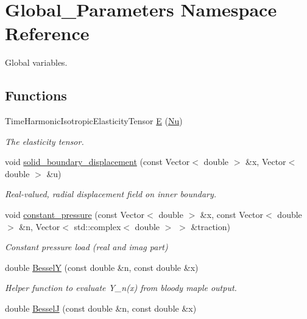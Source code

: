 \hypertarget{namespaceGlobal__Parameters}{}\section{Global\+\_\+\+Parameters Namespace Reference}
\label{namespaceGlobal__Parameters}


Global variables.  


\subsection*{Functions}
\begin{DoxyCompactItemize}
\item 
Time\+Harmonic\+Isotropic\+Elasticity\+Tensor \hyperlink{namespaceGlobal__Parameters_aeeb26e11ef275bdfce14710e00290bb6}{E} (\hyperlink{namespaceGlobal__Parameters_a20fccdcfa2c15ad8b951b9ada3bb1661}{Nu})
\begin{DoxyCompactList}\small\item\em The elasticity tensor. \end{DoxyCompactList}\item 
void \hyperlink{namespaceGlobal__Parameters_a95af753fa152ac6013bc4f640816f7ce}{solid\+\_\+boundary\+\_\+displacement} (const Vector$<$ double $>$ \&x, Vector$<$ double $>$ \&u)
\begin{DoxyCompactList}\small\item\em Real-\/valued, radial displacement field on inner boundary. \end{DoxyCompactList}\item 
void \hyperlink{namespaceGlobal__Parameters_a8363ab9f8687e9f7802f801f6dcab6e6}{constant\+\_\+pressure} (const Vector$<$ double $>$ \&x, const Vector$<$ double $>$ \&n, Vector$<$ std\+::complex$<$ double $>$ $>$ \&traction)
\begin{DoxyCompactList}\small\item\em Constant pressure load (real and imag part) \end{DoxyCompactList}\item 
double \hyperlink{namespaceGlobal__Parameters_a51c78ffbd213fe1293eef5d048abcc5a}{BesselY} (const double \&n, const double \&x)
\begin{DoxyCompactList}\small\item\em Helper function to evaluate Y\+\_\+n(x) from bloody maple output. \end{DoxyCompactList}\item 
double \hyperlink{namespaceGlobal__Parameters_aa3dda8c7600df01ddcd31b966230c5ba}{BesselJ} (const double \&n, const double \&x)

\end{DoxyCompactItemize}
